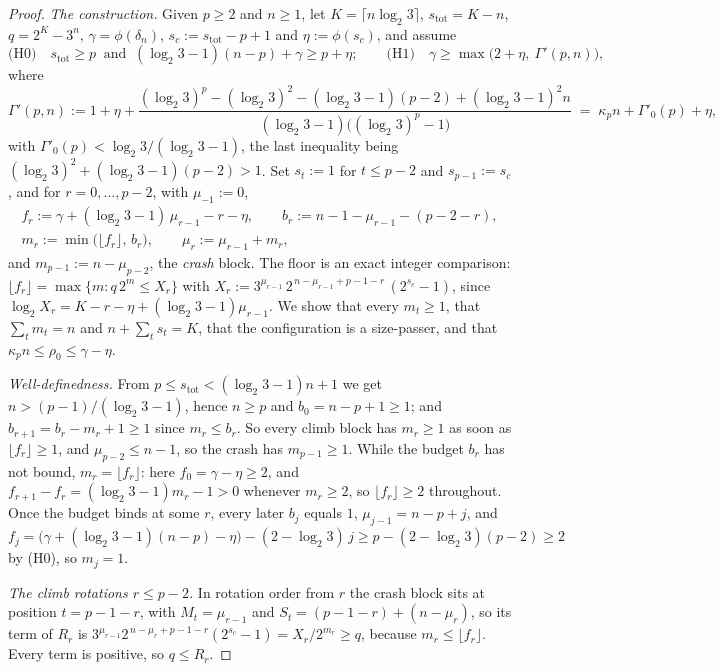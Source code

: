 \documentclass[11pt]{article}
\theoremstyle{remark}
\newcommand{\LL}{\log_2 3}
\newcommand{\kp}{\kappa_p}
\newcommand{\stot}{s_{\mathrm{tot}}}
\begin{document}
\begin{proof}
\emph{The construction.} Given $p \ge 2$ and $n \ge 1$, let $K = \lceil n\LL\rceil$, $\stot = K - n$, $q = 2^K - 3^n$, $\gamma = \phi(\delta_n)$, $s_c := \stot - p + 1$ and $\eta := \phi(s_c)$, and assume
\[ \text{(H0)}\quad \stot \ge p \ \text{ and } \ (\LL-1)(n-p) + \gamma \ge p + \eta; \qquad
   \text{(H1)}\quad \gamma \ge \max\bigl(2 + \eta,\ \Gamma'(p,n)\bigr), \]
where
\[ \Gamma'(p,n) := 1 + \eta + \frac{(\LL)^p - (\LL)^2 - (\LL-1)(p-2) + (\LL-1)^2 n}{(\LL-1)\bigl((\LL)^p - 1\bigr)} \;=\; \kp n + \Gamma'_0(p) + \eta, \]
with $\Gamma'_0(p) < \LL/(\LL-1)$, the last inequality being $(\LL)^2 + (\LL-1)(p-2) > 1$. Set $s_t := 1$ for $t \le p-2$ and $s_{p-1} := s_c$, and for $r = 0,\dots,p-2$, with $\mu_{-1} := 0$,
\[ \begin{gathered} f_r := \gamma + (\LL-1)\,\mu_{r-1} - r - \eta, \qquad b_r := n - 1 - \mu_{r-1} - (p-2-r), \\ m_r := \min\bigl(\lfloor f_r \rfloor,\, b_r\bigr), \qquad \mu_r := \mu_{r-1} + m_r, \end{gathered} \]
and $m_{p-1} := n - \mu_{p-2}$, the \emph{crash} block. The floor is an exact integer comparison: $\lfloor f_r\rfloor = \max\{m : q\,2^m \le X_r\}$ with $X_r := 3^{\mu_{r-1}}\,2^{\,n - \mu_{r-1} + p - 1 - r}\,(2^{s_c}-1)$, since $\log_2 X_r = K - r - \eta + (\LL-1)\mu_{r-1}$. We show that every $m_t \ge 1$, that $\sum_t m_t = n$ and $n + \sum_t s_t = K$, that the configuration is a size-passer, and that $\kp n \le \rho_0 \le \gamma - \eta$.

\emph{Well-definedness.} From $p \le \stot < (\LL-1)n + 1$ we get $n > (p-1)/(\LL-1)$, hence $n \ge p$ and $b_0 = n - p + 1 \ge 1$; and $b_{r+1} = b_r - m_r + 1 \ge 1$ since $m_r \le b_r$. So every climb block has $m_r \ge 1$ as soon as $\lfloor f_r\rfloor \ge 1$, and $\mu_{p-2} \le n - 1$, so the crash has $m_{p-1} \ge 1$. While the budget $b_r$ has not bound, $m_r = \lfloor f_r\rfloor$: here $f_0 = \gamma - \eta \ge 2$, and $f_{r+1} - f_r = (\LL-1)m_r - 1 > 0$ whenever $m_r \ge 2$, so $\lfloor f_r\rfloor \ge 2$ throughout. Once the budget binds at some $r$, every later $b_j$ equals $1$, $\mu_{j-1} = n - p + j$, and $f_j = \bigl(\gamma + (\LL-1)(n-p) - \eta\bigr) - (2-\LL)\,j \ge p - (2-\LL)(p-2) \ge 2$ by (H0), so $m_j = 1$.

\emph{The climb rotations $r \le p-2$.} In rotation order from $r$ the crash block sits at position $t = p-1-r$, with $M_t = \mu_{r-1}$ and $S_t = (p-1-r) + (n - \mu_r)$, so its term of $R_r$ is $3^{\mu_{r-1}}2^{\,n - \mu_r + p - 1 - r}(2^{s_c}-1) = X_r/2^{m_r} \ge q$, because $m_r \le \lfloor f_r\rfloor$. Every term is positive, so $q \le R_r$.


\end{proof}
\end{document}
